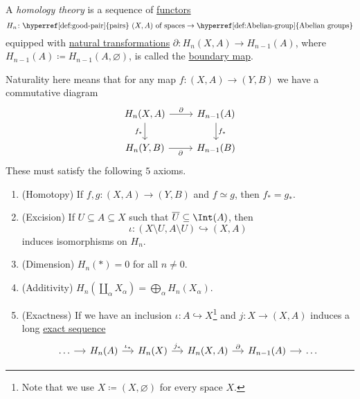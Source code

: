 \begin{definition}\label{def:homology-theory}
	A \emph{homology theory} is a sequence of \hyperref[def:functor]{functors}
	\[
		H_n \colon \text{\hyperref[def:good-pair]{pairs} \((X, A)\) of spaces} \to \text{\hyperref[def:Abelian-group]{Abelian groups}}
	\]
	equipped with \hyperref[def:natural-transformation]{natural transformations} \(\partial \colon H_n(X, A) \to H_{n - 1}(A)\),
	where \(H_{n - 1}(A) \coloneqq H_{n - 1}(A, \varnothing)\), is called the \underline{boundary map}.

	Naturality here means that for any map \(f \colon (X, A) \to (Y, B)\) we have a commutative diagram
	\[
		\begin{tikzcd}
			{H_{n}(X, A)} & {H_{n-1}(A)} \\
			{H_n(Y, B)} & {H_{n-1}(B)}
			\arrow["{\partial }", from=1-1, to=1-2]
			\arrow["{f_\ast}", from=1-2, to=2-2]
			\arrow["{\partial }"', from=2-1, to=2-2]
			\arrow["{f_\ast}"', from=1-1, to=2-1]
		\end{tikzcd}
	\]
	These must satisfy the following \(5\) axioms.
	\begin{enumerate}
		\item (Homotopy) If \(f, g \colon (X, A) \to (Y, B)\) and \(f \simeq g\), then \(f_\ast = g_\ast\).
		\item (Excision) If \(U \subseteq A \subseteq X\) such that \(\overline{U} \subseteq \Int  (A)\), then
		      \[
			      \iota \colon (X \setminus U, A \setminus U) \hookrightarrow (X, A)
		      \]
		      induces isomorphisms on \(H_n\).
		\item (Dimension) \(H_n(\ast) = 0\) for all \(n \neq 0\).
		\item (Additivity) \(H_n\left(\coprod_\alpha X_\alpha\right) = \bigoplus_\alpha H_n(X_\alpha)\).
		\item (Exactness) If we have an inclusion \(\iota \colon A \hookrightarrow X\)\footnote{Note that we use
			      \(X\coloneqq (X, \varnothing )\) for every space \(X\).} and \(j \colon X \to (X, A)\) induces a
		      long \hyperref[def:exact-sequence]{exact sequence}
		      \[
			      \begin{tikzcd}[column sep=small]
				      \ldots & {H_n(A)} & {H_n(X)} & {H_{n}(X, A)} & {H_{n-1}(A)} & \ldots
				      \arrow[from=1-1, to=1-2]
				      \arrow["{\iota_\ast}", from=1-2, to=1-3]
				      \arrow["{j_\ast}", from=1-3, to=1-4]
				      \arrow["\partial", from=1-4, to=1-5]
				      \arrow[from=1-5, to=1-6]
			      \end{tikzcd}
		      \]
	\end{enumerate}
\end{definition}

